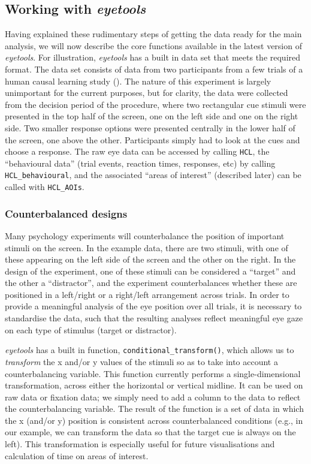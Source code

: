 \documentclass[
  man,
  floatsintext,
  longtable,
  nolmodern,
  notxfonts,
  notimes,
  colorlinks=true,linkcolor=blue,citecolor=blue,urlcolor=blue]{apa7}
\begin{document}
\subsection{\texorpdfstring{Working with
\emph{eyetools}}{Working with eyetools}}\label{working-with-eyetools}

Having explained these rudimentary steps of getting the data ready for
the main analysis, we will now describe the core functions available in
the latest version of \emph{eyetools}. For illustration, \emph{eyetools}
has a built in data set that meets the required format. The data set
consists of data from two participants from a few trials of a human
causal learning study (). The nature of this experiment is largely unimportant for the
current purposes, but for clarity, the data were collected from the
decision period of the procedure, where two rectangular cue stimuli were
presented in the top half of the screen, one on the left side and one on
the right side. Two smaller response options were presented centrally in
the lower half of the screen, one above the other. Participants simply
had to look at the cues and choose a response. The raw eye data can be
accessed by calling \texttt{HCL}, the ``behavioural data'' (trial
events, reaction times, responses, etc) by calling
\texttt{HCL\_behavioural}, and the associated ``areas of interest''
(described later) can be called with \texttt{HCL\_AOIs}.

\subsubsection{Counterbalanced designs}\label{counterbalanced-designs}

Many psychology experiments will counterbalance the position of
important stimuli on the screen. In the example data, there are two
stimuli, with one of these appearing on the left side of the screen and
the other on the right. In the design of the experiment, one of these
stimuli can be considered a ``target'' and the other a ``distractor'',
and the experiment counterbalances whether these are positioned in a
left/right or a right/left arrangement across trials. In order to
provide a meaningful analysis of the eye position over all trials, it is
necessary to standardise the data, such that the resulting analyses
reflect meaningful eye gaze on each type of stimulus (target or
distractor).

\emph{eyetools} has a built in function,
\texttt{conditional\_transform()}, which allows us to \emph{transform}
the x and/or y values of the stimuli so as to take into account a
counterbalancing variable. This function currently performs a
single-dimensional transformation, across either the horizontal or
vertical midline. It can be used on raw data or fixation data; we simply
need to add a column to the data to reflect the counterbalancing
variable. The result of the function is a set of data in which the x
(and/or y) position is consistent across counterbalanced conditions
(e.g., in our example, we can transform the data so that the target cue
is always on the left). This transformation is especially useful for
future visualisations and calculation of time on areas of interest.
\end{document}
